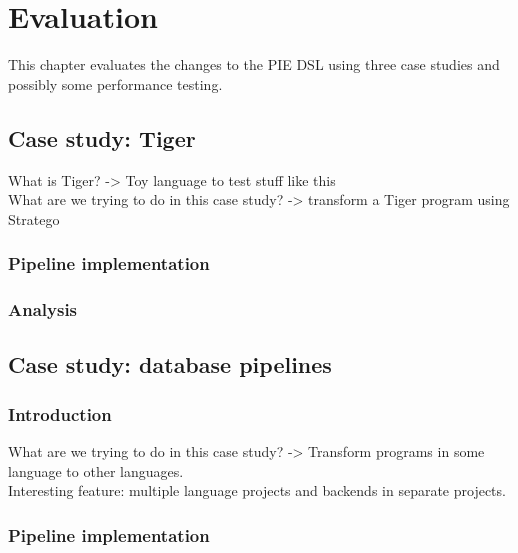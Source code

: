 \chapter{Evaluation}
\label{chap:evaluation}

This chapter evaluates the changes to the \ac{PIE} \ac{DSL} using three case studies and possibly some performance testing.

\section{Case study: Tiger}
\label{sec:evaluation__tiger}

What is Tiger?
-> Toy language to test stuff like this
\\
What are we trying to do in this case study?
-> transform a Tiger program using Stratego

\subsection{Pipeline implementation}
\label{subsec:evaluation__tiger__implementation}


\subsection{Analysis}
\label{sec:evaluation__tiger__analysis}



\section{Case study: database pipelines}
\label{sec:evaluation__database}

\subsection{Introduction}
\label{sec:evaluation__database__introduction}
What are we trying to do in this case study?
-> Transform programs in some language to other languages.
\\
Interesting feature: multiple language projects and backends in separate projects.


\subsection{Pipeline implementation}
\label{sec:evaluation__database__implementation}

